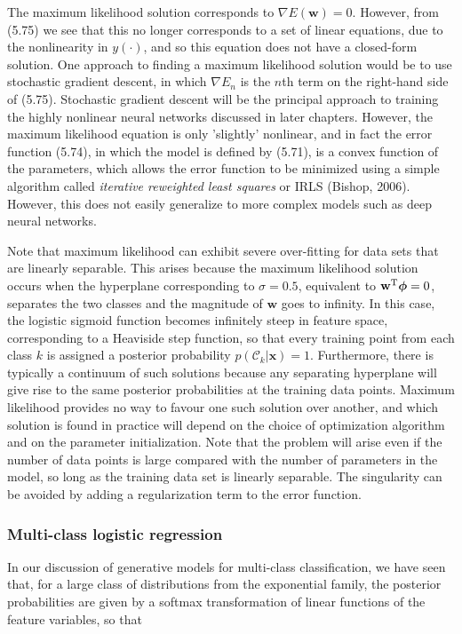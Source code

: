 \documentclass{article}
\begin{document}
The maximum likelihood solution corresponds to $\nabla E(\mathbf{w})=0$. However, from (5.75) we see that this no longer corresponds to a set of linear equations, due to the nonlinearity in $y(\cdot)$, and so this equation does not have a closed-form solution. One approach to finding a maximum likelihood solution would be to use stochastic gradient descent, in which $\nabla E_{n}$ is the $n$th term on the right-hand side of (5.75). Stochastic gradient descent will be the principal approach to training the highly nonlinear neural networks discussed in later chapters. However, the maximum likelihood equation is only 'slightly' nonlinear, and in fact the error function (5.74), in which the model is defined by (5.71), is a convex function of the parameters, which allows the error function to be minimized using a simple algorithm called \textit{iterative reweighted least squares} or IRLS (Bishop, 2006). However, this does not easily generalize to more complex models such as deep neural networks.

Note that maximum likelihood can exhibit severe over-fitting for data sets that are linearly separable. This arises because the maximum likelihood solution occurs when the hyperplane corresponding to $\sigma=0.5$, equivalent to $\mathbf{w}^{\rm T}\boldsymbol{\phi}=0$, separates the two classes and the magnitude of $\mathbf{w}$ goes to infinity. In this case, the logistic sigmoid function becomes infinitely steep in feature space, corresponding to a Heaviside step function, so that every training point from each class $k$ is assigned a posterior probability $p(\mathcal{C}_{k}|\mathbf{x})=1$. Furthermore, there is typically a continuum of such solutions because any separating hyperplane will give rise to the same posterior probabilities at the training data points. Maximum likelihood provides no way to favour one such solution over another, and which solution is found in practice will depend on the choice of optimization algorithm and on the parameter initialization. Note that the problem will arise even if the number of data points is large compared with the number of parameters in the model, so long as the training data set is linearly separable. The singularity can be avoided by adding a regularization term to the error function.

\subsubsection{Multi-class logistic regression}

In our discussion of generative models for multi-class classification, we have seen that, for a large class of distributions from the exponential family, the posterior probabilities are given by a softmax transformation of linear functions of the feature variables, so that
\end{document}
